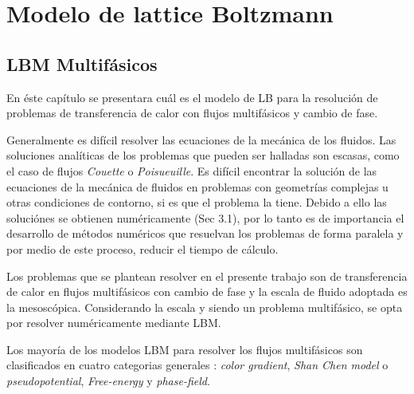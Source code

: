 \chapter{Modelo de lattice Boltzmann}

\graphicspath{{figs/cap2/}}
\label{cap2}

\section{LBM Multifásicos}

En éste capítulo se presentara cuál es el modelo de LB para la resolución de problemas de transferencia de calor con flujos multifásicos y cambio de fase.

Generalmente es difícil resolver las ecuaciones de la mecánica de los fluidos. Las soluciones analíticas de los problemas que pueden ser halladas son escasas, como el caso de flujos \textit{Couette} o \textit{Poisueuille}. Es difícil encontrar la solución de las ecuaciones de la mecánica de fluidos en problemas con geometrías complejas u otras condiciones de contorno, si es que el problema la tiene. Debido a ello las soluciónes se obtienen numéricamente \cite{kruger2017lattice}(Sec 3.1), por lo tanto es de importancia el desarrollo de métodos numéricos que resuelvan los problemas de forma paralela y por medio de este proceso, reducir el tiempo de cálculo.

Los problemas que se plantean resolver en el presente trabajo son de transferencia de calor en flujos multifásicos con cambio de fase y la escala de fluido adoptada es la mesoscópica. Considerando la escala y siendo un problema multifásico, se opta por resolver numéricamente mediante LBM. 


Los mayoría de los modelos LBM para resolver los flujos multifásicos son clasificados en cuatro categorias generales : \textit{color gradient}, \textit{Shan Chen model} o \textit{pseudopotential}, \textit{Free-energy} y  \textit{phase-field}. 


